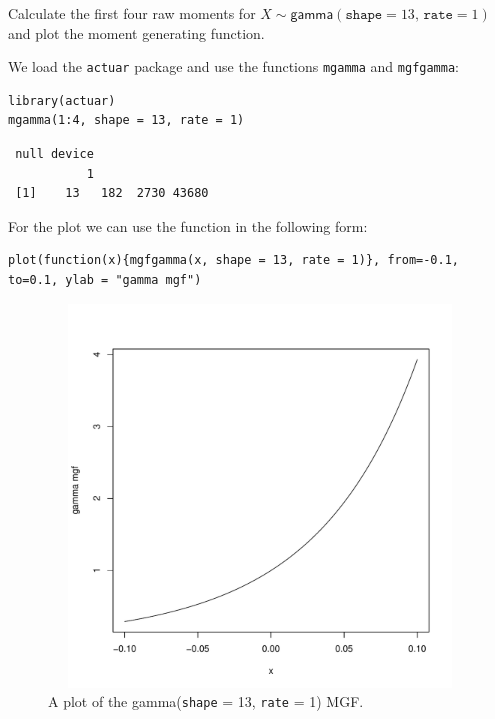 \documentclass[captions=tableheading]{scrbook}
\begin{document}
\begin{example}
Calculate the first four raw moments for \(X\sim\mathsf{gamma}(\mathtt{shape}=13,\,\mathtt{rate}=1)\) and plot the moment generating function.

We load the \texttt{actuar} package and use the functions \texttt{mgamma} and \texttt{mgfgamma}:

\begin{verbatim}
library(actuar)
mgamma(1:4, shape = 13, rate = 1)
\end{verbatim}

\begin{verbatim}
 null device 
           1
 [1]    13   182  2730 43680
\end{verbatim}

For the plot we can use the function in the following form:


\begin{verbatim}
plot(function(x){mgfgamma(x, shape = 13, rate = 1)}, from=-0.1, to=0.1, ylab = "gamma mgf")
\end{verbatim}



\begin{figure}[th]
    \includegraphics[width=5in, height=4in]{img/gamma-mgf.pdf}
    \caption[Plot of the \textsf{gamma}(\texttt{shape} = 13, \texttt{rate} = 1) MGF]{\small A plot of the \textsf{gamma}(\texttt{shape} = 13, \texttt{rate} = 1) MGF.}
    \label{fig:gamma-mgf}
  \end{figure}

\end{example}
\end{document}
